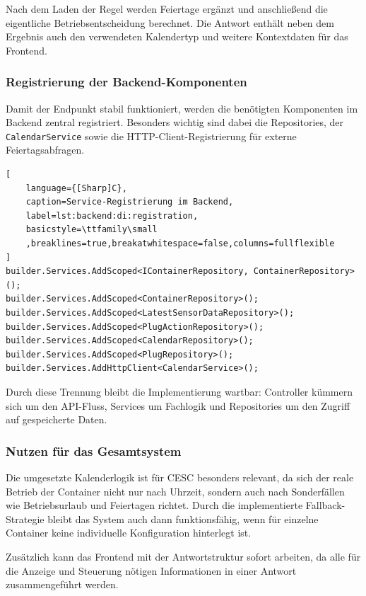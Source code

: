 Nach dem Laden der Regel werden Feiertage ergänzt und anschließend die eigentliche Betriebsentscheidung berechnet. Die Antwort enthält neben dem Ergebnis auch den verwendeten Kalendertyp und weitere Kontextdaten für das Frontend.

\subsubsection{Registrierung der Backend-Komponenten}

Damit der Endpunkt stabil funktioniert, werden die benötigten Komponenten im Backend zentral registriert. Besonders wichtig sind dabei die Repositories, der \texttt{CalendarService} sowie die HTTP-Client-Registrierung für externe Feiertagsabfragen.

\begin{lstlisting}[
    language={[Sharp]C},
    caption=Service-Registrierung im Backend,
    label=lst:backend:di:registration,
    basicstyle=\ttfamily\small
    ,breaklines=true,breakatwhitespace=false,columns=fullflexible
]
builder.Services.AddScoped<IContainerRepository, ContainerRepository>();
builder.Services.AddScoped<ContainerRepository>();
builder.Services.AddScoped<LatestSensorDataRepository>();
builder.Services.AddScoped<PlugActionRepository>();
builder.Services.AddScoped<CalendarRepository>();
builder.Services.AddScoped<PlugRepository>();
builder.Services.AddHttpClient<CalendarService>();
\end{lstlisting}

Durch diese Trennung bleibt die Implementierung wartbar: Controller kümmern sich um den API-Fluss, Services um Fachlogik und Repositories um den Zugriff auf gespeicherte Daten.

\subsubsection{Nutzen für das Gesamtsystem}

Die umgesetzte Kalenderlogik ist für CESC besonders relevant, da sich der reale Betrieb der Container nicht nur nach Uhrzeit, sondern auch nach Sonderfällen wie Betriebsurlaub und Feiertagen richtet. Durch die implementierte Fallback-Strategie bleibt das System auch dann funktionsfähig, wenn für einzelne Container keine individuelle Konfiguration hinterlegt ist.

Zusätzlich kann das Frontend mit der Antwortstruktur sofort arbeiten, da alle für die Anzeige und Steuerung nötigen Informationen in einer Antwort zusammengeführt werden.


